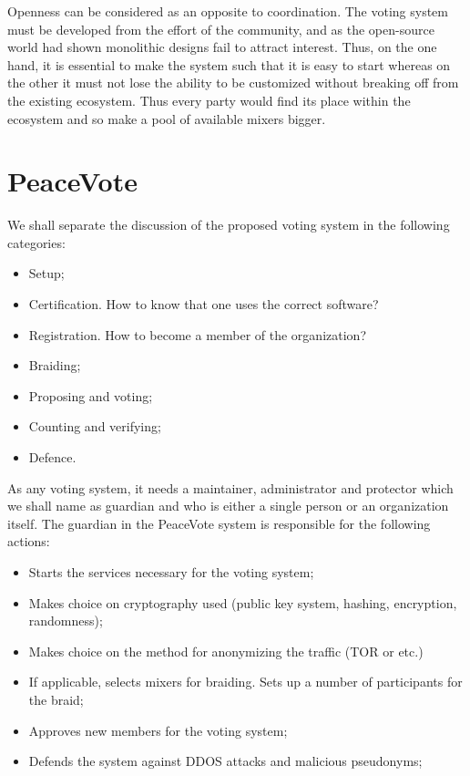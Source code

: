 \documentclass[12pt,a4paper]{article}
\let\Oldsection\section
\renewcommand{\section}{\FloatBarrier\Oldsection}
\begin{document}
Openness can be considered as an opposite to coordination. The voting system must be developed from the effort of the community, and as the open-source world had shown monolithic designs fail to attract interest. Thus, on the one hand, it is essential to make the system such that it is easy to start whereas on the other it must not lose the ability to be customized without breaking off from the existing ecosystem. Thus every party would find its place within the ecosystem and so make a pool of available mixers bigger.\par
\section{PeaceVote}
We shall separate the discussion of the proposed voting system in the following categories:\par
\begin{itemize}
\setlength{\itemsep}{0pt}
\setlength{\parskip}{0pt}
\item
Setup;\par
\item
Certification. How to know that one uses the correct software?\par
\item
Registration. How to become a member of the organization?\par
\item
Braiding;\par
\item
Proposing and voting;\par
\item
Counting and verifying;\par
\item
Defence.\par
\end{itemize}
As any voting system, it needs a maintainer, administrator and protector which we shall name as guardian and who is either a single person or an organization itself. The guardian in the PeaceVote system is responsible for the following actions:\par
\begin{itemize}
\setlength{\itemsep}{0pt}
\setlength{\parskip}{0pt}
\item
Starts the services necessary for the voting system;\par
\item
Makes choice on cryptography used (public key system, hashing, encryption, randomness);\par
\item
Makes choice on the method for anonymizing the traffic (TOR or etc.)\par
\item
If applicable, selects mixers for braiding. Sets up a number of participants for the braid;\par
\item
Approves new members for the voting system;\par
\item
Defends the system against DDOS attacks and malicious pseudonyms;\par
\end{itemize}
\end{document}
